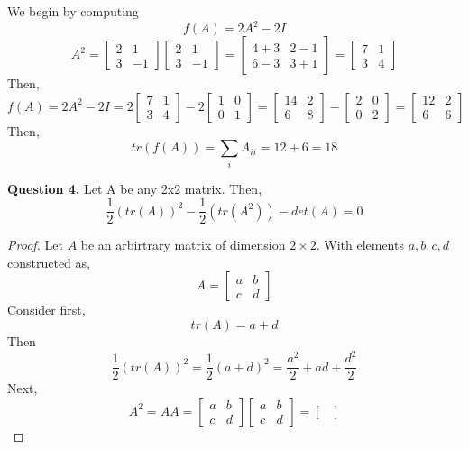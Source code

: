 \documentclass[letterpaper,10pt]{article}
\begin{document}
\begin{description}
\begin{enumerate}[label=\alph*.]
We begin by computing
\[f(A)=2A^2-2I\]
\[A^2=\begin{bmatrix}
2 & 1 \\
3 & -1
\end{bmatrix} \begin{bmatrix}
2 & 1 \\
3 & -1
\end{bmatrix}=\begin{bmatrix}
4+3 & 2-1 \\
6-3 & 3+1
\end{bmatrix}=\begin{bmatrix}
7 & 1\\
3 & 4
\end{bmatrix} \]
Then,
\[f(A)=2A^2-2I=2\begin{bmatrix}
7 & 1\\
3 & 4
\end{bmatrix}-2\begin{bmatrix}
1 & 0\\
0 & 1
\end{bmatrix}=\begin{bmatrix}
14 & 2\\
6 & 8
\end{bmatrix}-\begin{bmatrix}
2 & 0\\
0 & 2
\end{bmatrix}=\begin{bmatrix}
12 & 2\\
6 & 6
\end{bmatrix} \]
Then,
\[tr(f(A))=\sum_iA_{ii}=12+6=18\]
\end{enumerate}
\item \textbf{Question 4.}
Let A be any 2x2 matrix. Then,
\[\frac{1}{2}(tr(A))^2-\frac{1}{2}(tr(A^2))-det(A)=0\]
\begin{proof}
Let $A$ be an arbirtrary matrix of dimension $2\times2$. With elements $a,b,c,d$ constructed as,
\[A=\begin{bmatrix}
a & b\\
c & d
\end{bmatrix}\]
Consider first,
\[tr(A)=a+d\]
Then
\[\frac{1}{2}(tr(A))^2=\frac{1}{2}(a+d)^2=\frac{a^2}{2}+ad+\frac{d^2}{2}\]
Next,
\[A^2=AA=\begin{bmatrix}
a & b\\
c & d
\end{bmatrix}\begin{bmatrix}
a & b\\
c & d
\end{bmatrix}=\begin{bmatrix}

\end{bmatrix}\]
\end{proof}
\end{description}
\end{document}
